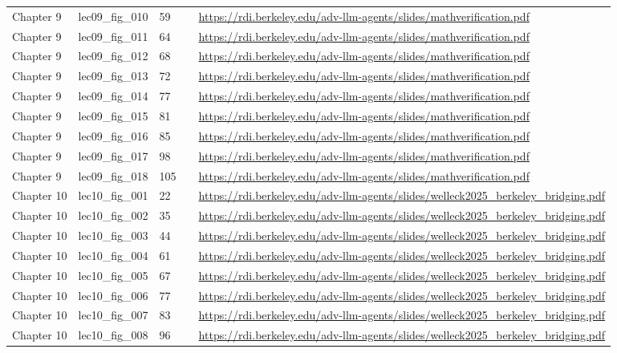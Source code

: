 \begin{longtable}{p{}p{}p{}p{}p{}}
Chapter 9 & lec09\_fig\_010 & 59 &  & \url{https://rdi.berkeley.edu/adv-llm-agents/slides/mathverification.pdf} \\
Chapter 9 & lec09\_fig\_011 & 64 &  & \url{https://rdi.berkeley.edu/adv-llm-agents/slides/mathverification.pdf} \\
Chapter 9 & lec09\_fig\_012 & 68 &  & \url{https://rdi.berkeley.edu/adv-llm-agents/slides/mathverification.pdf} \\
Chapter 9 & lec09\_fig\_013 & 72 &  & \url{https://rdi.berkeley.edu/adv-llm-agents/slides/mathverification.pdf} \\
Chapter 9 & lec09\_fig\_014 & 77 &  & \url{https://rdi.berkeley.edu/adv-llm-agents/slides/mathverification.pdf} \\
Chapter 9 & lec09\_fig\_015 & 81 &  & \url{https://rdi.berkeley.edu/adv-llm-agents/slides/mathverification.pdf} \\
Chapter 9 & lec09\_fig\_016 & 85 &  & \url{https://rdi.berkeley.edu/adv-llm-agents/slides/mathverification.pdf} \\
Chapter 9 & lec09\_fig\_017 & 98 &  & \url{https://rdi.berkeley.edu/adv-llm-agents/slides/mathverification.pdf} \\
Chapter 9 & lec09\_fig\_018 & 105 &  & \url{https://rdi.berkeley.edu/adv-llm-agents/slides/mathverification.pdf} \\
Chapter 10 & lec10\_fig\_001 & 22 &  & \url{https://rdi.berkeley.edu/adv-llm-agents/slides/welleck2025_berkeley_bridging.pdf} \\
Chapter 10 & lec10\_fig\_002 & 35 &  & \url{https://rdi.berkeley.edu/adv-llm-agents/slides/welleck2025_berkeley_bridging.pdf} \\
Chapter 10 & lec10\_fig\_003 & 44 &  & \url{https://rdi.berkeley.edu/adv-llm-agents/slides/welleck2025_berkeley_bridging.pdf} \\
Chapter 10 & lec10\_fig\_004 & 61 &  & \url{https://rdi.berkeley.edu/adv-llm-agents/slides/welleck2025_berkeley_bridging.pdf} \\
Chapter 10 & lec10\_fig\_005 & 67 &  & \url{https://rdi.berkeley.edu/adv-llm-agents/slides/welleck2025_berkeley_bridging.pdf} \\
Chapter 10 & lec10\_fig\_006 & 77 &  & \url{https://rdi.berkeley.edu/adv-llm-agents/slides/welleck2025_berkeley_bridging.pdf} \\
Chapter 10 & lec10\_fig\_007 & 83 &  & \url{https://rdi.berkeley.edu/adv-llm-agents/slides/welleck2025_berkeley_bridging.pdf} \\
Chapter 10 & lec10\_fig\_008 & 96 &  & \url{https://rdi.berkeley.edu/adv-llm-agents/slides/welleck2025_berkeley_bridging.pdf} \\

\end{longtable}
